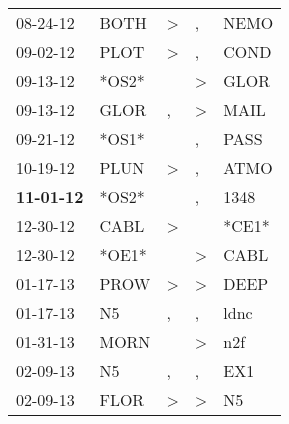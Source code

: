 \begin{supertabular}{p{0.07\textwidth}p{0.06\textwidth}p{0.02\textwidth}p{0.02\textwidth}p{0.06\textwidth}}
          08-24-12\textsuperscript{} &           BOTH\textsuperscript{} &     \textgreater &                , &           NEMO\textsuperscript{} \\
          09-02-12\textsuperscript{} &           PLOT\textsuperscript{} &     \textgreater &                , &           COND\textsuperscript{} \\
          09-13-12\textsuperscript{} &                            *OS2* &                  &     \textgreater &           GLOR\textsuperscript{} \\
          09-13-12\textsuperscript{} &           GLOR\textsuperscript{} &                , &     \textgreater &           MAIL\textsuperscript{} \\
          09-21-12\textsuperscript{} &                            *OS1* &                  &                , &           PASS\textsuperscript{} \\
          10-19-12\textsuperscript{} &           PLUN\textsuperscript{} &     \textgreater &                , &           ATMO\textsuperscript{} \\
 \textbf{11-01-12\textsuperscript{}} &                            *OS2* &                  &                , &           1348\textsuperscript{} \\
          12-30-12\textsuperscript{} &           CABL\textsuperscript{} &     \textgreater &                  &                            *CE1* \\
          12-30-12\textsuperscript{} &                            *OE1* &                  &     \textgreater &           CABL\textsuperscript{} \\
          01-17-13\textsuperscript{} &           PROW\textsuperscript{} &     \textgreater &     \textgreater &           DEEP\textsuperscript{} \\
          01-17-13\textsuperscript{} &             N5\textsuperscript{} &                , &                , &           ldnc\textsuperscript{} \\
          01-31-13\textsuperscript{} &           MORN\textsuperscript{} &                  &     \textgreater &            n2f\textsuperscript{} \\
          02-09-13\textsuperscript{} &             N5\textsuperscript{} &                , &                , &            EX1\textsuperscript{} \\
          02-09-13\textsuperscript{} &           FLOR\textsuperscript{} &     \textgreater &     \textgreater &             N5\textsuperscript{} \\

\end{supertabular}
